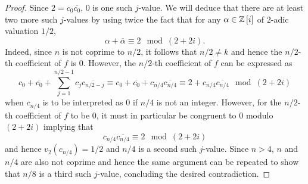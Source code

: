 \documentclass[../main.tex]{subfiles}
\begin{document}
\begin{proof}
  Since $2 = c_0 \overline{c_0}$, $0$ is one such $j$-value.
  We will deduce that there are at least two more such $j$-values by using twice the fact that for any $\alpha \in \mathbb{Z}\left[ i \right]$ of $2$-adic valuation $1/2$, 
  $$\alpha + \overline{\alpha} \equiv 2 \mod \left( 2 + 2i \right).$$
  Indeed, since $n$ is not coprime to $n/2$, it follows that $n/2 \neq k$ and hence the $n/2$-th coefficient of $f$ is $0$.
  However, the $n/2$-th coefficient of $f$ can be expressed as
  \[
    c_0 + \overline{c_0} + \sum_{j = 1}^{n/2 - 1} c_j \overline{c_{n/2 - j}} 
    \equiv
    c_0 + \overline{c_0} + c_{n/4} \overline{c_{n/4}}
    \equiv
    2 + c_{n/4} \overline{c_{n/4}}    
    \mod \left( 2 + 2i \right)
  \]
  when $c_{n/4}$ is to be interpreted as $0$ if $n/4$ is not an integer.
  However, for the $n/2$-th coefficient of $f$ to be $0$, it must in particular be congruent to $0$ modulo $\left( 2 + 2i \right)$ implying that $$c_{n/4} \overline{c_{n/4}} \equiv 2 \mod \left( 2 + 2i \right)$$ and hence $v_2\left( c_{n/4} \right) = 1/2$ and $n/4$ is a second such $j$-value.
  Since $n > 4$, $n$ and $n/4$ are also not coprime and hence the same argument can be repeated to show that $n/8$ is a third such $j$-value, concluding the desired contradiction.
\end{proof}
\end{document}
